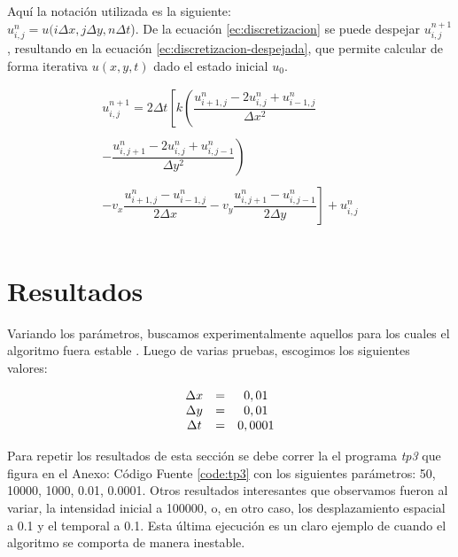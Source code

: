\documentclass[twocolumn,a4paper,10pt]{article}
\begin{document}
Aqu\'i la notaci\'on utilizada es la siguiente: \\
$u_{i, j}^{n} = u(i\Delta x, j\Delta y, n\Delta t$).
De la ecuaci\'on \ref{ec:discretizacion} se puede despejar $u_{i,j}^{n+1}$, resultando en la ecuaci\'on \ref{ec:discretizacion-despejada}, que permite calcular 
de forma iterativa $u(x,y,t)$ dado el estado inicial $u_{0}$.

\begin{equation}
\label{ec:discretizacion-despejada}
\begin{array}{c}
u_{i,j}^{n+1} = 2\Delta t \left[ k \left( \dfrac{u_{i+1,j}^{n} - 2u_{i,j}^{n} + u_{i-1,j}^{n}}{\Delta x^2} \right.\right.\\
    \\
    \left. - \dfrac{u_{i,j+1}^{n} - 2u_{i,j}^{n} + u_{i,j-1}^{n}}{\Delta y^2}  \right) \\
     \\
 \left. - v_{x}\dfrac{u_{i+1,j}^{n} - u_{i-1,j}^{n}}{2\Delta x} -  v_{y}\dfrac{u_{i,j+1}^{n} - u_{i,j-1}^{n}}{2\Delta y} \right] + u_{i,j}^{n} \\
    \\
\end{array}       
\end{equation}

\section{Resultados}
\label{sec:resultados}

Variando los par\'ametros, buscamos experimentalmente aquellos para los cuales el algoritmo fuera estable \cite{Numerical-stability}. Luego de varias pruebas, 
escogimos los siguientes valores:

\begin{equation}
    \nonumber
    \begin{array}{c c c}
        \Delta x & = & 0,01 \\
        \Delta y & = & 0,01 \\
        \Delta t & = & 0,0001 \\
    \end{array}
\end{equation}

Para repetir los resultados de esta secci\'on se debe correr la el programa \textit{tp3} que figura en el Anexo: C\'odigo Fuente \ref{code:tp3} con los 
siguientes par\'ametros: 50, 10000, 1000, 0.01, 0.0001. Otros resultados interesantes que observamos fueron al variar, la intensidad inicial a 100000, o, en otro caso,
 los desplazamiento espacial a 0.1 y el temporal a 0.1. Esta última ejecuci\'on es un claro ejemplo de cuando el algoritmo se comporta de manera inestable.\\
\end{document}
